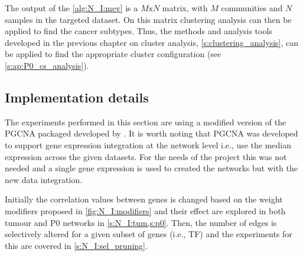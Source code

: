 The output of the \cref{alg:N_I:mev} is a $M\text{x}N$ matrix, with $M$ communities and $N$ samples in the targeted dataset. On this matrix clustering analysis can then be applied to find the cancer subtypes. Thus, the methods and analysis tools developed in the previous chapter on cluster analysis, \cref{s:clustering_analysis}, can be applied to find the appropriate cluster configuration (see \cref{s:ap:P0_cs_analysis}).


\subsection{Implementation details} \label{s:N_I:implementation}

The experiments performed in this section are using a modified version of the PGCNA packaged developed by \citet{Care2019-ij}. It is worth noting that PGCNA was developed to support gene expression integration at the network level i.e., use the median expression across the given datasets. For the needs of the project this was not needed and a single gene expression is used to created the networks but with the new data integration. 

Initially the correlation values between genes is changed based on the weight modifiers proposed in \cref{fig:N_I:modifiers} and their effect are explored in both tumour and P0 networks in \cref{s:N_I:tum,s:p0}. Then, the number of edges is selectively altered for a given subset of genes (i.e., TF) and the experiments for this are covered in \cref{s:N_I:sel_pruning}. 





